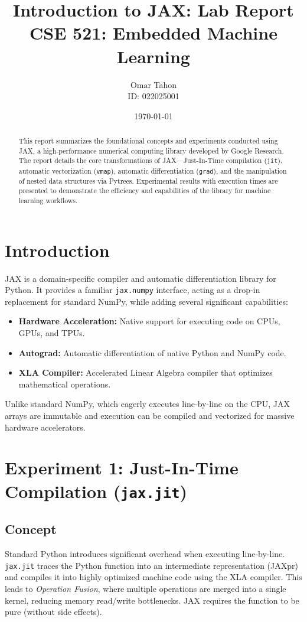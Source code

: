\documentclass[12pt, a4paper]{article}
\title{\textbf{Introduction to JAX: Lab Report}\\ \large CSE 521: Embedded Machine Learning}
\author{Omar Tahon \\ ID: 022025001}
\date{\today}
\begin{document}
\maketitle

\begin{abstract}
This report summarizes the foundational concepts and experiments conducted using JAX, a high-performance numerical computing library developed by Google Research. The report details the core transformations of JAX---Just-In-Time compilation (\texttt{jit}), automatic vectorization (\texttt{vmap}), automatic differentiation (\texttt{grad}), and the manipulation of nested data structures via Pytrees. Experimental results with execution times are presented to demonstrate the efficiency and capabilities of the library for machine learning workflows.
\end{abstract}

\section{Introduction}
JAX is a domain-specific compiler and automatic differentiation library for Python. It provides a familiar \texttt{jax.numpy} interface, acting as a drop-in replacement for standard NumPy, while adding several significant capabilities:
\begin{itemize}
    \item \textbf{Hardware Acceleration:} Native support for executing code on CPUs, GPUs, and TPUs.
    \item \textbf{Autograd:} Automatic differentiation of native Python and NumPy code.
    \item \textbf{XLA Compiler:} Accelerated Linear Algebra compiler that optimizes mathematical operations.
\end{itemize}

Unlike standard NumPy, which eagerly executes line-by-line on the CPU, JAX arrays are immutable and execution can be compiled and vectorized for massive hardware accelerators.

\section{Experiment 1: Just-In-Time Compilation (\texttt{jax.jit})}
\subsection{Concept}
Standard Python introduces significant overhead when executing line-by-line. \texttt{jax.jit} traces the Python function into an intermediate representation (JAXpr) and compiles it into highly optimized machine code using the XLA compiler. This leads to \textit{Operation Fusion}, where multiple operations are merged into a single kernel, reducing memory read/write bottlenecks. JAX requires the function to be pure (without side effects).
\end{document}
